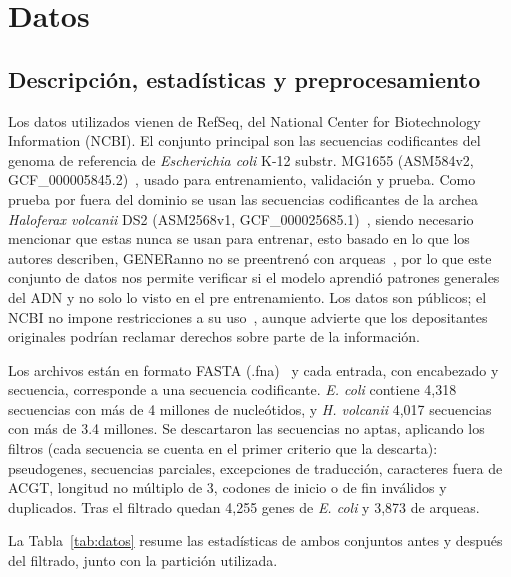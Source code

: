 \documentclass[sigconf,nonacm]{acmart}
\begin{document}
\section{Datos}\label{sec:datos}

\subsection{Descripción, estadísticas y preprocesamiento}\label{sec:datos-descripcion}

Los datos utilizados vienen de RefSeq, del National Center for Biotechnology Information (NCBI). El conjunto principal son las secuencias codificantes del genoma de referencia de \emph{Escherichia coli} K-12 substr. MG1655 (ASM584v2, GCF\_000005845.2)~\cite{ncbi_ecoli}, usado para entrenamiento, validación y prueba. Como prueba por fuera del dominio se usan las secuencias codificantes de la archea \emph{Haloferax volcanii} DS2 (ASM2568v1, GCF\_000025685.1)~\cite{ncbi_hvolcanii}, siendo necesario mencionar que estas nunca se usan para entrenar, esto basado en lo que los autores describen, GENERanno no se preentrenó con arqueas~\cite{li2025generanno}, por lo que este conjunto de datos nos permite verificar si el modelo aprendió patrones generales del ADN y no solo lo visto en el pre entrenamiento. Los datos son públicos; el NCBI no impone restricciones a su uso~\cite{ncbi_policies}, aunque advierte que los depositantes originales podrían reclamar derechos sobre parte de la información.

Los archivos están en formato FASTA (.fna)~\cite{ncbi_fasta} y cada entrada, con encabezado y secuencia, corresponde a una secuencia codificante. \emph{E. coli} contiene 4,318 secuencias con más de 4 millones de nucleótidos, y \emph{H. volcanii} 4,017 secuencias con más de 3.4 millones. Se descartaron las secuencias no aptas, aplicando los filtros (cada secuencia se cuenta en el primer criterio que la descarta): pseudogenes, secuencias parciales, excepciones de traducción, caracteres fuera de ACGT, longitud no múltiplo de 3, codones de inicio o de fin inválidos y duplicados. Tras el filtrado quedan 4,255 genes de \emph{E. coli} y 3,873 de arqueas.

La Tabla~\ref{tab:datos} resume las estadísticas de ambos conjuntos antes y después del filtrado, junto con la partición utilizada.
\end{document}
